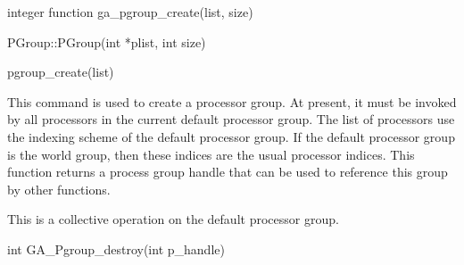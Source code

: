 \documentclass[12pt]{article}
\begin{document}
\begin{fapi}
\begin{fcode}
integer function ga_pgroup_create(list, size)
\end{fcode}
\begin{funcargs}
\end{funcargs}
\end{fapi}

\begin{cxxapi}
\begin{cxxcode}
PGroup::PGroup(int *plist, int size)
\end{cxxcode}
\begin{funcargs}
\end{funcargs}
\end{cxxapi}

\begin{pyapi}
\begin{pycode}
pgroup_create(list)
\end{pycode}
\end{pyapi}

\dcoll

\begin{desc}

  This command is used to create a processor group. At present, it
  must be invoked by all processors in the current default processor
  group. The list of processors use the indexing scheme of the default
  processor group. If the default processor group is the world group,
  then these indices are the usual processor indices. This function
  returns a process group handle that can be used to reference this
  group by other functions.

  This is a collective operation on the default processor group.

\end{desc}



\begin{capi}
\begin{ccode}
int GA_Pgroup_destroy(int p_handle)
\end{ccode}
\begin{funcargs}
\end{funcargs}
\end{capi}
\end{document}

